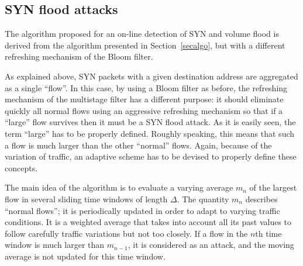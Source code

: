 \documentclass{amsart}
\begin{document}
\subsection{SYN flood attacks}

The  algorithm proposed for an on-line detection of SYN and volume flood is derived  from
 the algorithm presented  in Section~\ref{secalgo}, but with a different refreshing 
mechanism of the Bloom filter. 

As explained above, SYN packets  with a given  destination  address are  aggregated  as a  single 
``flow''. In this case, by using a Bloom filter as before,  the refreshing mechanism of the
multistage filter has a different purpose: it should eliminate quickly all normal flows
using an aggressive refreshing mechanism so that if a ``large''  flow survives then it must
be a SYN flood attack. As it is easily seen, the term ``large''  has to be properly
defined. Roughly speaking, this means that such a flow  is much larger  than the other ``normal'' flows. 
Again, because of the variation of traffic, an adaptive scheme has to be devised to properly define
 these concepts. 

The main idea of the algorithm is to  evaluate a varying average $m_n$ of the largest flow
in several sliding time windows of  length $\Delta$. The quantity $m_n$ describes ``normal
flows''; it is periodically updated in order to adapt to varying traffic conditions. It is
a weighted average that takes into account all its past values to follow carefully traffic
variations but  not too closely. If  a flow in the  $n$th time window is  much larger than
$m_{n-1}$, it is considered  as an attack, and the moving average  is not updated for this
time window.
\end{document}
